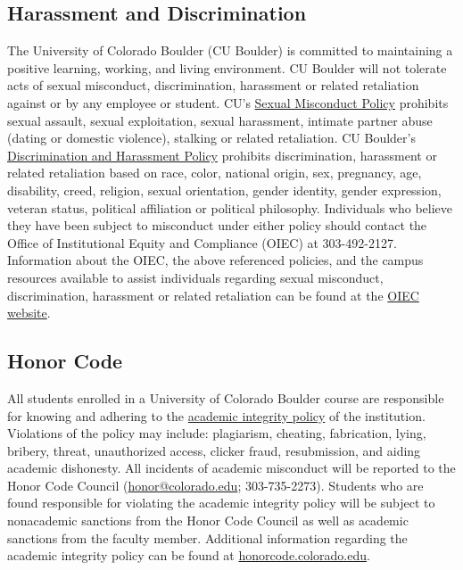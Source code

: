 \documentclass[10pt]{memoir}
\begin{document}
\subsection{Harassment and Discrimination}
The University of Colorado Boulder (CU Boulder) is committed to maintaining a positive learning, working, and living environment. CU Boulder will not tolerate acts of sexual misconduct, discrimination, harassment or related retaliation against or by any employee or student. CU's \href{http://www.colorado.edu/policies/discrimination-and-harassment-policy-and-procedures}{Sexual Misconduct Policy} prohibits sexual assault, sexual exploitation, sexual harassment, intimate partner abuse (dating or domestic violence), stalking or related retaliation. CU Boulder's \href{http://www.colorado.edu/policies/discrimination-and-harassment-policy-and-procedures}{Discrimination and Harassment Policy} prohibits discrimination, harassment or related retaliation based on race, color, national origin, sex, pregnancy, age, disability, creed, religion, sexual orientation, gender identity, gender expression, veteran status, political affiliation or political philosophy. Individuals who believe they have been subject to misconduct under either policy should contact the Office of Institutional Equity and Compliance (OIEC) at 303-492-2127. Information about the OIEC, the above referenced policies, and the campus resources available to assist individuals regarding sexual misconduct, discrimination, harassment or related retaliation can be found at the \href{http://www.colorado.edu/institutionalequity/}{OIEC website}.

\subsection{Honor Code}
All students enrolled in a University of Colorado Boulder course are responsible for knowing and adhering to the \href{http://www.colorado.edu/policies/academic-integrity-policy}{academic integrity policy} of the institution. Violations of the policy may include: plagiarism, cheating, fabrication, lying, bribery, threat, unauthorized access, clicker fraud, resubmission, and aiding academic dishonesty. All incidents of academic misconduct will be reported to the Honor Code Council (\href{mailto:honor@colorado.edu}{honor@colorado.edu}; 303-735-2273). Students who are found responsible for violating the academic integrity policy will be subject to nonacademic sanctions from the Honor Code Council as well as academic sanctions from the faculty member. Additional information regarding the academic integrity policy can be found at \href{http://honorcode.colorado.edu}{honorcode.colorado.edu}. 
\end{document}
